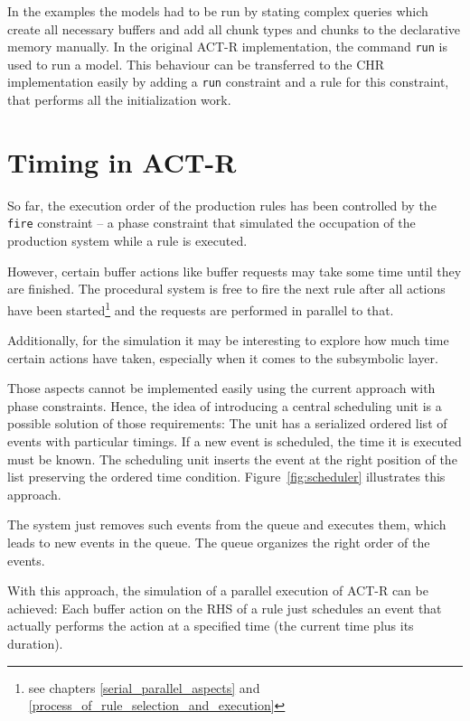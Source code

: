 In the examples the models had to be run by stating complex queries which create all necessary buffers and add all chunk types and chunks to the declarative memory manually. In the original ACT-R implementation, the command \verb|run| is used to run a model. This behaviour can be transferred to the CHR implementation easily by adding a \verb|run| constraint and a rule for this constraint, that performs all the initialization work.


\section{Timing in ACT-R}

So far, the execution order of the production rules has been controlled by the \verb|fire| constraint -- a phase constraint that simulated the occupation of the production system while a rule is executed.

However, certain buffer actions like buffer requests may take some time until they are finished. The procedural system is free to fire the next rule after all actions have been started\footnote{see chapters \ref{serial_parallel_aspects} and \ref{process_of_rule_selection_and_execution}} and the requests are performed in parallel to that.

Additionally, for the simulation it may be interesting to explore how much time certain actions have taken, especially when it comes to the subsymbolic layer.

Those aspects cannot be implemented easily using the current approach with phase constraints. Hence, the idea of introducing a central scheduling unit is a possible solution of those requirements: The unit has a serialized ordered list of events with particular timings. If a new event is scheduled, the time it is executed must be known. The scheduling unit inserts the event at the right position of the list preserving the ordered time condition. Figure~\ref{fig:scheduler} illustrates this approach.

The system just removes such events from the queue and executes them, which leads to new events in the queue. The queue organizes the right order of the events.

With this approach, the simulation of a parallel execution of ACT-R can be achieved: Each buffer action on the RHS of a rule just schedules an event that actually performs the action at a specified time (the current time plus its duration). 

